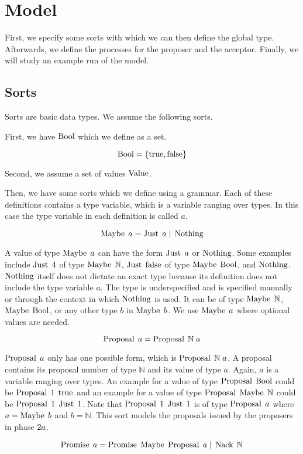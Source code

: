 \chapter{Model}
First, we specify some sorts with which we can then define the global type.
Afterwards, we define the processes for the proposer and the acceptor.
Finally, we will study an example run of the model.

\section{Sorts}
Sorts are basic data types.
We assume the following sorts.

First, we have $\operatorname{Bool}$ which we define as a set.

\[\operatorname{Bool} = \left\{\operatorname{true}, \operatorname{false}\right\}\]

Second, we assume a set of values $\operatorname{Value}$.

Then, we have some sorts which we define using a grammar.
Each of these definitions contains a type variable, which is a variable ranging over types.
In this case the type variable in each definition is called $a$.

\[\operatorname{Maybe}\; a = \operatorname{Just}\; a \; | \; \operatorname{Nothing}\]

A value of type $\operatorname{Maybe}\; a$ can have the form $\operatorname{Just}\; a$ or $\operatorname{Nothing}$.
Some examples include $\operatorname{Just}\; 4$ of type $\operatorname{Maybe}\; \mathbb{N}$, $\operatorname{Just}\; \operatorname{false}$ of type $\operatorname{Maybe}\; \operatorname{Bool}$, and $\operatorname{Nothing}$.
$\operatorname{Nothing}$ itself does not dictate an exact type because its definition does not include the type variable $a$.
The type is underspecified and is specified manually or through the context in which $\operatorname{Nothing}$ is used.
It can be of type $\operatorname{Maybe}\; \mathbb{N}$, $\operatorname{Maybe}\; \operatorname{Bool}$, or any other type $b$ in $\operatorname{Maybe}\; b$.
We use $\operatorname{Maybe}\; a$ where optional values are needed.

\[\operatorname{Proposal}\; a = \operatorname{Proposal}\; \mathbb{N}\; a\]

$\operatorname{Proposal}\; a$ only has one possible form, which is $\operatorname{Proposal}\; \mathbb{N}\; a$.
A proposal contains its proposal number of type $\mathbb{N}$ and its value of type $a$.
Again, $a$ is a variable ranging over types.
An example for a value of type $\operatorname{Proposal}\; \operatorname{Bool}$ could be $\operatorname{Proposal}\; 1\; \operatorname{true}$ and an example for a value of type $\operatorname{Proposal}\; \operatorname{Maybe}\; \mathbb{N}$ could be $\operatorname{Proposal}\; 1\; \operatorname{Just}\; 1$.
Note that $\operatorname{Proposal}\; 1\; \operatorname{Just}\; 1$ is of type $\operatorname{Proposal}\; a$ where $a = \operatorname{Maybe}\; b$ and $b = \mathbb{N}$.
This sort models the proposals issued by the proposers in phase $2a$.

\[\operatorname{Promise}\; a = \operatorname{Promise}\; \operatorname{Maybe}\; \operatorname{Proposal}\; a \; | \; \operatorname{Nack}\; \mathbb{N}\]

